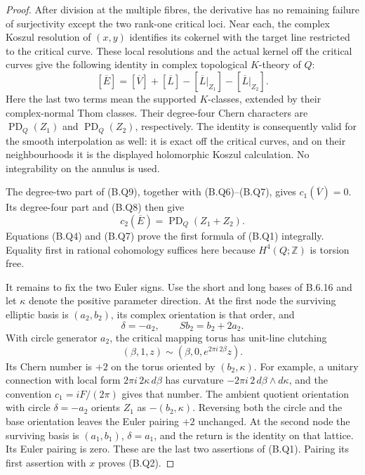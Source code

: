 \begin{proof}
After division at the multiple fibres, the derivative
has no remaining failure of surjectivity except the two
rank-one critical loci.  Near each, the complex Koszul
resolution of $(x,y)$ identifies its cokernel with the
target line restricted to the critical curve.  These local
resolutions and the actual kernel off the critical curves
give the following identity in complex topological
$K$-theory of $Q$:
\[
 [\overline E]=[\overline V]+[\overline L]
       -[\overline L|_{Z_1}]-[\overline L|_{Z_2}].
 \tag{B.Q9}
\]
Here the last two terms mean the supported $K$-classes,
extended by their complex-normal Thom classes.  Their
degree-four Chern characters are
$\operatorname{PD}_Q(Z_1)$ and
$\operatorname{PD}_Q(Z_2)$, respectively.  The identity
is consequently valid for the smooth interpolation as
well: it is exact off the critical curves, and on their
neighbourhoods it is the displayed holomorphic Koszul
calculation.  No integrability on the annulus is used.

The degree-two part of (B.Q9), together with (B.Q6)--(B.Q7),
gives $c_1(\overline V)=0$.  Its degree-four part and
(B.Q8) then give
\[
 c_2(\overline E)=\operatorname{PD}_Q(Z_1+Z_2).
\]
Equations (B.Q4) and (B.Q7) prove the first formula of
(B.Q1) integrally.  Equality first in rational cohomology
suffices here because $H^4(Q;\mathbb Z)$ is torsion free.

It remains to fix the two Euler signs.  Use the short and
long bases of B.6.16 and let $\kappa$ denote the positive
parameter direction.  At the first node the surviving
elliptic basis is $(a_2,b_2)$, its complex orientation is
that order, and
\[
 \delta=-a_2,\qquad S b_2=b_2+2a_2.
\]
With circle generator $a_2$, the critical mapping torus
has unit-line clutching
\[
 (\beta,1,z)\sim(\beta,0,e^{2\pi i\,2\beta}z).
\]
Its Chern number is $+2$ on the torus oriented by
$(b_2,\kappa)$.  For example, a unitary connection with
local form $2\pi i\,2\kappa\,d\beta$ has curvature
$-2\pi i\,2\,d\beta\wedge d\kappa$, and the convention
$c_1=iF/(2\pi)$ gives that number.  The ambient quotient
orientation with circle $\delta=-a_2$ orients $Z_1$ as
$-(b_2,\kappa)$.  Reversing both the circle and the base
orientation leaves the Euler pairing $+2$ unchanged.
At the second node the surviving basis is $(a_1,b_1)$,
$\delta=a_1$, and the return is the identity on that
lattice.  Its Euler pairing is zero.  These are the last
two assertions of (B.Q1).  Pairing its first assertion
with $x$ proves (B.Q2).
\end{proof}
